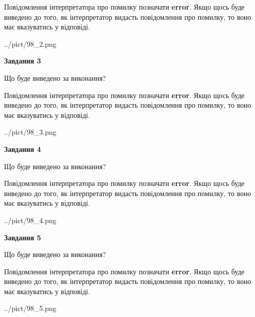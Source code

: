 \documentclass[12pt, ukrainian]{article}
\begin{document}
{\begin {large}
Повідомлення інтерпретатора про помилку позначати \textbf{error}.
Якщо щось буде виведено до того, як інтерпретатор видасть повідомлення про помилку, 
то воно має вказуватись у відповіді. \par


\begin{center}
	{../pict/98_2.png}
\end{center}
\newpage

{\begin {center}\textbf{Завдання 3}\end {center}}\par
Що буде виведено за виконання?

Повідомлення інтерпретатора про помилку позначати \textbf{error}.
Якщо щось буде виведено до того, як інтерпретатор видасть повідомлення про помилку, 
то воно має вказуватись у відповіді. \par


\begin{center}
	{../pict/98_3.png}
\end{center}
\newpage

{\begin {center}\textbf{Завдання 4}\end {center}}\par
Що буде виведено за виконання?

Повідомлення інтерпретатора про помилку позначати \textbf{error}.
Якщо щось буде виведено до того, як інтерпретатор видасть повідомлення про помилку, 
то воно має вказуватись у відповіді. \par


\begin{center}
	{../pict/98_4.png}
\end{center}
\newpage

{\begin {center}\textbf{Завдання 5}\end {center}}\par
Що буде виведено за виконання?

Повідомлення інтерпретатора про помилку позначати \textbf{error}.
Якщо щось буде виведено до того, як інтерпретатор видасть повідомлення про помилку, 
то воно має вказуватись у відповіді. \par


\begin{center}
	{../pict/98_5.png}
\end{center}
\newpage


\end{large}}
\end{document}
